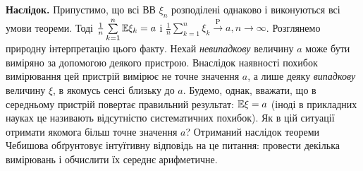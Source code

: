 \noindent\textbf{Наслідок.}
    Припустимо, що всі ВВ $\xi_n$ розподілені однаково і виконуються всі умови теореми. Тоді 
    $\frac{1}{n}\sum\limits_{k=1}^n \mathbb{E}\xi_k = a$ і $\frac{1}{n}\sum\limits_{k=1}^n \xi_k 
    \overset{\mathrm{P}}{\longrightarrow} a, n\to\infty$. Розглянемо природну інтерпретацію цього факту.
    Нехай \emph{невипадкову} величину $a$ може бути виміряно за допомогою деякого пристрою. 
    Внаслідок наявності похибок вимірювання цей пристрій вимірює не точне значення $a$, 
    а лише деяку \emph{випадкову} величину $\xi$, в якомусь сенсі близьку до $a$. 
    Будемо, однак, вважати, що в середньому пристрій повертає правильний результат: 
    $\mathbb{E}\xi=a$ (іноді в прикладних науках це називають відсутністю систематичних похибок). 
    Як в цій ситуації отримати якомога більш точне значення $a$? Отриманий наслідок теореми Чебишова обґрунтовує
    інтуїтивну відповідь на це питання: провести декілька вимірювань і обчислити їх середнє арифметичне.

